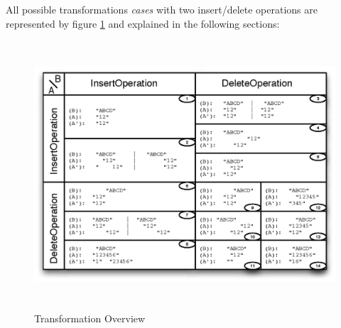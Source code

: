 All possible transformations \emph{cases} with two insert/delete operations are represented by figure \ref{Transformation Overview} and explained in the following sections:
\begin{figure}[H]
\centering
\includegraphics[height=9.98cm,width=13.75cm]{../../images/algo-impl/transform_overview.eps}
\caption{Transformation Overview}
\label{Transformation Overview}
\end{figure}

